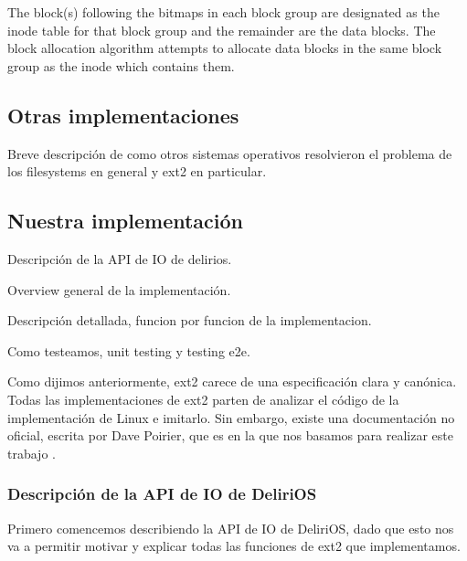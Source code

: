 The block(s) following the bitmaps in each block group are designated as the inode table for that block group and the remainder are the data blocks. The block allocation algorithm attempts to allocate data blocks in the same block group as the inode which contains them.






\subsection{Otras implementaciones}
\begin{puntos}
  \item Breve descripción de como otros sistemas operativos resolvieron el problema de los filesystems en general y ext2 en particular.
\end{puntos}



\subsection{Nuestra implementación}
\begin{puntos}
  \item Descripción de la API de IO de delirios.
  \item Overview general de la implementación.
  \item Descripción detallada, funcion por funcion de la implementacion.
  \item Como testeamos, unit testing y testing e2e.
\end{puntos}

Como dijimos anteriormente, ext2 carece de una especificación clara y canónica.
Todas las implementaciones de ext2 parten de analizar el código de la implementación de Linux e imitarlo.
Sin embargo, existe una documentación no oficial, escrita por Dave Poirier, que es en la que nos basamos para realizar este trabajo \cite{ext2doc}.

\subsubsection{Descripción de la API de IO de DeliriOS}

Primero comencemos describiendo la API de IO de DeliriOS, dado que esto nos va a permitir motivar y explicar todas las funciones de ext2 que implementamos.


